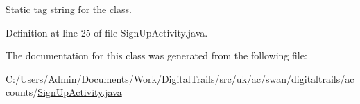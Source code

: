 Static tag string for the class. 



Definition at line 25 of file Sign\+Up\+Activity.\+java.



The documentation for this class was generated from the following file\+:\begin{DoxyCompactItemize}
\item 
C\+:/\+Users/\+Admin/\+Documents/\+Work/\+Digital\+Trails/src/uk/ac/swan/digitaltrails/accounts/\hyperlink{_sign_up_activity_8java}{Sign\+Up\+Activity.\+java}\end{DoxyCompactItemize}
